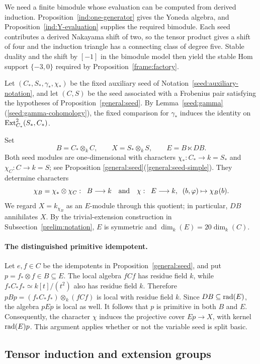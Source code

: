 \documentclass[11pt]{article}
\begin{document}
We need a finite bimodule whose evaluation can be computed from
derived induction. Proposition~\ref{ind:one-generator} gives the
Yoneda algebra, and Proposition~\ref{ind:Y-evaluation} supplies
the required bimodule.
Each seed contributes a derived Nakayama shift of two, so the tensor
product gives a shift of four and the induction triangle has a
connecting class of degree five. Stable duality and the shift by
$[-1]$ in the bimodule model then yield the stable Hom support
$\{-3,0\}$ required by Proposition~\ref{frame:factory}.

Let $(C_*,S_*,\gamma_*,\chi_*)$ be the fixed auxiliary seed of
Notation~\ref{seed:auxiliary-notation}, and let $(C,S)$ be the seed
associated with a Frobenius pair satisfying the hypotheses of
Proposition~\ref{general:seed}. By
Lemma~\ref{seed:gamma}\,\textup{(\ref{seed:gamma-cohomology})}, the fixed comparison for
$\gamma_*$ induces the identity on ${\rm Ext}_{C_*}^2(S_*,C_*)$.

Set
\[
 B=C_*\otimes_k C,\qquad X=S_*\otimes_k S,
 \qquad E=B\ltimes DB.
\]
Both seed modules are one-dimensional with characters $\chi_*:C_*\to k=S_*$ and $\chi_C: C\to k=S$; see Proposition \ref{general:seed}\textup{(\ref{general:seed-simple})}. They determine characters
$$\chi_B=\chi_*\otimes\chi_C:\;\;B\longrightarrow k\quad\mbox{and}\quad
\chi:\;\;E\longrightarrow k,\;\; (b,\varphi)\mapsto \chi_B(b).$$
We regard $X=k_{\chi_B}$ as an $E$-module through this quotient; in particular,
$DB$ annihilates $X$. By the trivial-extension construction in
Subsection~\ref{prelim:notation}, $E$ is symmetric and
$\dim_k(E)=20\dim_k(C)$.

\paragraph{The distinguished primitive idempotent.}
Let $e,f\in C$ be the idempotents in Proposition~\ref{general:seed}, and put
$p=f_*\otimes f\in B\subseteq E$. The local algebra $fCf$ has residue field $k$, while
$f_*C_*f_*\simeq k[t]/(t^2)$ also has residue field $k$.
Therefore $pBp=(f_*C_*f_*)\otimes_k(fCf)$ is local with residue field $k$.
Since $DB\subseteq{\rm rad}(E)$, the algebra $pEp$ is local as well.
It follows that $p$ is primitive in both $B$ and $E$. Consequently,
the character $\chi$ induces the projective cover $Ep\to X$, with
kernel ${\rm rad}(E)p$.
This argument applies whether or not the variable seed is split basic.

\subsection{Tensor induction and extension groups}
\end{document}
